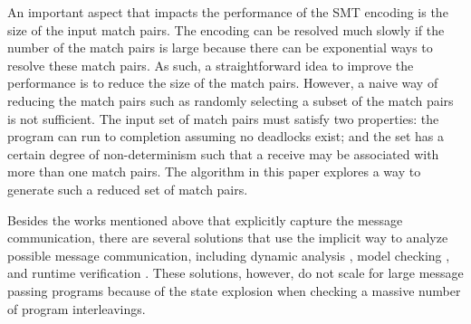 An important aspect that impacts the performance of the SMT encoding is the size of the input match pairs. The encoding can be resolved much slowly if the number of the match pairs is large because there can be exponential ways to resolve these match pairs. As such, a straightforward idea to improve the performance is to reduce the size of the match pairs. However, a naive way of reducing the match pairs such as randomly selecting a subset of the match pairs is not sufficient. The input set of match pairs must satisfy two properties: the program can run to completion assuming no deadlocks exist; and the set has a certain degree of non-determinism such that a receive may be associated with more than one match pairs.   
The algorithm in this paper explores a way to generate such a reduced set of match pairs.


Besides the works mentioned above that explicitly capture the message communication, there are several solutions that use the implicit way to analyze possible message communication, including dynamic analysis \cite{DBLP:conf/ppopp/VakkalankaSGK08,DBLP:conf/sbmf/SharmaGB12}, model checking \cite{DBLP:conf/vmcai/Siegel07,DBLP:conf/pvm/Siegel07}, and runtime verification \cite{DBLP:conf/sc/VetterS00,DBLP:conf/parco/KrammerBMR03,DBLP:conf/ptw/HilbrichSSM09}. These solutions, however, do not scale for large message passing programs because of the state explosion when checking a massive number of program interleavings. 



